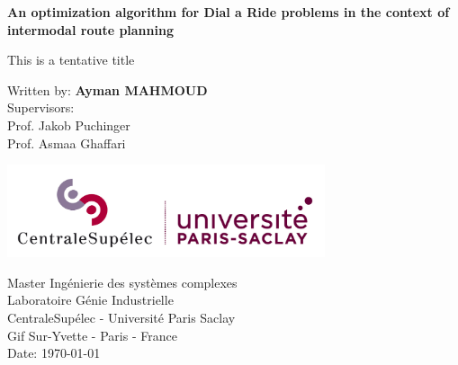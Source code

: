 \documentclass{article}
\begin{document}
\begin{titlepage}
   \begin{center}
       \vspace*{1cm}

	 \textbf{An optimization algorithm for Dial a Ride problems in the context of intermodal route planning}
\vspace{0.5cm}

       \vspace{0.5cm}
        This is a tentative title
                    
       \vspace{1.5cm}

       Written by:	\textbf{Ayman MAHMOUD} \\
       Supervisors: \\
       Prof. Jakob Puchinger\\
       Prof. Asmaa Ghaffari\\

       \vfill
            
       \vspace{0.8cm}
     
       \includegraphics[width=0.7\textwidth]{pictures/logo_nouveau.jpg}
            
       Master Ingénierie des systèmes complexes\\
       Laboratoire Génie Industrielle\\
       CentraleSupélec - Université Paris Saclay\\
       Gif Sur-Yvette - Paris - France\\
       Date: \today
            
   \end{center}
\end{titlepage}

\tableofcontents

\end{document}
